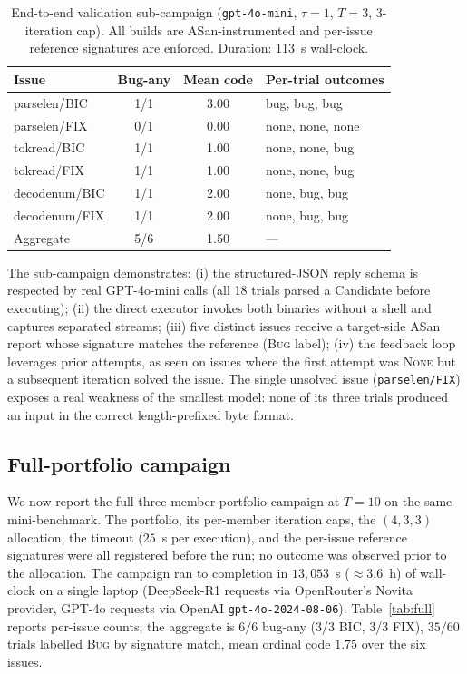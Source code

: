 \documentclass{article}
\begin{document}
\begin{table}[H]
\centering
\caption{End-to-end validation sub-campaign
(\texttt{gpt-4o-mini}, $\tau{=}1$, $T{=}3$, 3-iteration cap). All builds are
ASan-instrumented and per-issue reference signatures are enforced.  Duration:
113~s wall-clock.}
\label{tab:smoke}
\small
\begin{tabular}{lccl}
\toprule
Issue & Bug-any & Mean code & Per-trial outcomes \\
\midrule
parselen/BIC & 1/1 & 3.00 & bug, bug, bug \\
parselen/FIX & 0/1 & 0.00 & none, none, none \\
tokread/BIC  & 1/1 & 1.00 & none, none, bug \\
tokread/FIX  & 1/1 & 1.00 & none, none, bug \\
decodenum/BIC & 1/1 & 2.00 & none, bug, bug \\
decodenum/FIX & 1/1 & 2.00 & none, bug, bug \\
\midrule
Aggregate & 5/6 & 1.50 & --- \\
\bottomrule
\end{tabular}
\end{table}

The sub-campaign demonstrates: (i) the structured-JSON reply schema is
respected by real GPT-4o-mini calls (all 18 trials parsed a Candidate before
executing); (ii) the direct executor invokes both binaries without a shell
and captures separated streams; (iii) five distinct issues receive a
target-side ASan report whose signature matches the reference (\textsc{Bug}
label); (iv) the feedback loop leverages prior attempts, as seen on issues
where the first attempt was \textsc{None} but a subsequent iteration solved
the issue.  The single unsolved issue (\texttt{parselen/FIX}) exposes a real
weakness of the smallest model: none of its three trials produced an input
in the correct length-prefixed byte format.

\subsection{Full-portfolio campaign}
\label{sec:integrated:full}

We now report the full three-member portfolio campaign at $T{=}10$ on the
same mini-benchmark.  The portfolio, its per-member iteration caps, the
$(4,3,3)$ allocation, the timeout ($25$~s per execution), and the per-issue
reference signatures were all registered before the run; no outcome was
observed prior to the allocation.  The campaign ran to completion in
$13{,}053$~s ($\approx 3.6$~h) of wall-clock on a single laptop
(DeepSeek-R1 requests via OpenRouter's Novita provider, GPT-4o requests via
OpenAI \texttt{gpt-4o-2024-08-06}).  Table~\ref{tab:full} reports per-issue
counts; the aggregate is $6/6$ bug-any (3/3 BIC, 3/3 FIX), $35/60$ trials
labelled \textsc{Bug} by signature match, mean ordinal code $1.75$ over the
six issues.
\end{document}
